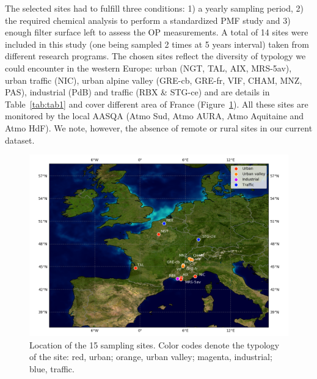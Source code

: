 \documentclass[acp]{copernicus}
\begin{document}
The selected sites had to fulfill three conditions: 1) a yearly sampling
period, 2) the required chemical analysis to perform a standardized PMF
study and 3) enough filter surface left to assess the OP measurements. A
total of 14 sites were included in this study (one being sampled 2 times
at 5 years interval) taken from different research programs. The chosen
sites reflect the diversity of typology we could encounter in the
western Europe: urban (NGT, TAL, AIX, MRS-5av), urban traffic (NIC),
urban alpine valley (GRE-cb, GRE-fr, VIF, CHAM, MNZ, PAS), industrial
(PdB) and traffic (RBX \& STG-ce) and are details in
Table~\ref{tab:tab1} and cover different
area of France (Figure~\ref{fig:fig1}).
All these sites are monitored by the local AASQA (Atmo Sud, Atmo AURA,
Atmo Aquitaine and Atmo HdF). We note, however, the absence of remote or
rural sites in our current dataset.

\begin{figure}[ht]
    \centering
    \includegraphics[width=0.7\linewidth]{figures/fig1}
    \caption{
    Location of the 15 sampling sites. Color codes denote the typology of the
    site: red, urban; orange, urban valley; magenta, industrial; blue, traffic.
    }%
    \label{fig:fig1}
\end{figure}
\end{document}
